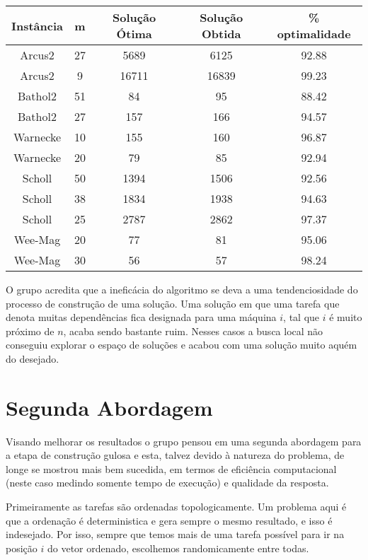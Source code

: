 \documentclass{report}
\begin{document}
\begin{table}[htbp]
 \begin{tabular}{|c|c|c|c|c|}
  \hline
  \textbf{Instância} & \textbf{m} & \textbf{Solução Ótima} & \textbf{Solução Obtida} & \% optimalidade \\
  \hline
  Arcus2 & 27 & 5689 & 6125 & 92.88 \\
  \hline
  Arcus2 & 9 & 16711 & 16839 & 99.23 \\
  \hline
  Bathol2 & 51 & 84 & 95 & 88.42 \\
  \hline
  Bathol2 & 27 & 157 & 166 & 94.57 \\
  \hline
  Warnecke & 10 & 155 & 160 & 96.87 \\
  \hline
  Warnecke & 20 & 79 & 85 & 92.94 \\
  \hline
  Scholl & 50 & 1394 & 1506 & 92.56 \\
  \hline
  Scholl & 38 & 1834 & 1938 & 94.63 \\
  \hline
  Scholl & 25 & 2787 & 2862 & 97.37 \\
  \hline
  Wee-Mag & 20 & 77 & 81 & 95.06 \\
  \hline
  Wee-Mag & 30 & 56 & 57 & 98.24 \\
  \hline
 \end{tabular}
\end{table}

O grupo acredita que a ineficácia do algoritmo se deva a uma tendenciosidade do
processo de construção de uma solução. Uma solução em que uma tarefa que denota
muitas dependências fica designada para uma máquina $i$, tal que $i$ é muito
próximo de $n$, acaba sendo bastante ruim. Nesses casos a busca local não
conseguiu explorar o espaço de soluções e acabou com uma solução muito aquém
do desejado.

\section{Segunda Abordagem}

Visando melhorar os resultados o grupo pensou em uma segunda abordagem para a
etapa de construção gulosa e esta, talvez devido à natureza do problema,
de longe se mostrou  mais bem sucedida, em termos de
eficiência computacional (neste caso medindo
somente tempo de execução) e qualidade da resposta.

Primeiramente as tarefas são ordenadas topologicamente.
Um problema aqui é que a ordenação é deterministica e gera
sempre o mesmo resultado, e isso é indesejado. Por isso, sempre que temos mais
de uma tarefa possível para ir na
posição $i$ do vetor ordenado, escolhemos randomicamente entre todas.
\end{document}
